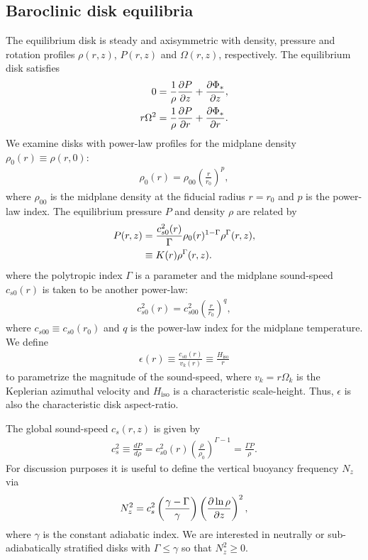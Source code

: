 \subsection{Baroclinic disk equilibria}\label{eqm}
The equilibrium disk is steady and axisymmetric with density,
pressure and rotation profiles $\rho(r,z)$, $P(r,z)$ and
$\Omega(r,z)$, respectively. The equilibrium disk satisfies
\begin{align}
  0 &= \frac{1}{\rho}\frac{\partial P}{\partial z} + \frac{\partial \Phi_*}{\partial z},\label{vert_equilibrium}\\
  r\Omega^2&= \frac{1}{\rho}\frac{\partial P}{\partial r} + \frac{\partial \Phi_*}{\partial
    r}.\label{hori_equilibrium} 
\end{align} 
We examine disks with power-law profiles for the midplane density
$\rho_0(r)\equiv\rho(r,0)$: 
\begin{align}
  \rho_0(r) = \rho_{00}\left(\frac{r}{r_0}\right)^p,
\end{align}
where $\rho_{00}$ is the midplane density at the fiducial radius
$r=r_0$ and $p$ is the power-law index. The equilibrium pressure $P$
and density $\rho$ are related by 
\begin{align}
  P(r,z) &= 
  \frac{c_{s0}^2(r)}{\Gamma}\rho_0(r)^{1-\Gamma}\rho^\Gamma(r,z),\notag\\
  & \equiv K(r)\rho^{\Gamma}(r,z). \label{eqm_press}
\end{align}
where the polytropic index $\Gamma$ is a parameter and 
the midplane sound-speed $c_{s0}(r)$ is taken to be another power-law: 
\begin{align}
  c_{s0}^2(r)=c_{s00}^2\left(\frac{r}{r_0}\right)^q, 
\end{align}
where $c_{s00}\equiv c_{s0}(r_0)$  and $q$ is the power-law index for
the midplane temperature. We define
\begin{align}
  \epsilon(r) \equiv \frac{c_{s0}(r)}{v_k(r)} \equiv
  \frac{H_\mathrm{iso}}{r} 
\end{align}
to parametrize the magnitude of the sound-speed, where
$v_k=r\Omega_k$ is the Keplerian azimuthal velocity and
$H_\mathrm{iso}$ is a characteristic scale-height.  Thus, $\epsilon$
is also the characteristic disk aspect-ratio.  

The global sound-speed $c_s(r,z)$ is given by
\begin{align}
  c_s^2\equiv \frac{dP}{d\rho} =
  c_{s0}^2(r)\left(\frac{\rho}{\rho_0}\right)^{\Gamma-1} = \frac{\Gamma P}{\rho}. 
\end{align}
For discussion purposes it is useful to define the vertical buoyancy frequency $N_z$ via
\begin{align}
  N_z^2 = c_s^2 \left(\frac{\gamma -
      \Gamma}{\gamma}\right)\left(\frac{\partial\ln\rho}{\partial z}\right)^2,   
\end{align}
where $\gamma$ is the constant adiabatic index. We are interested in
neutrally or sub-adiabatically stratified 
disks with $\Gamma\leq \gamma$ so that $N_z^2\geq0$.  

